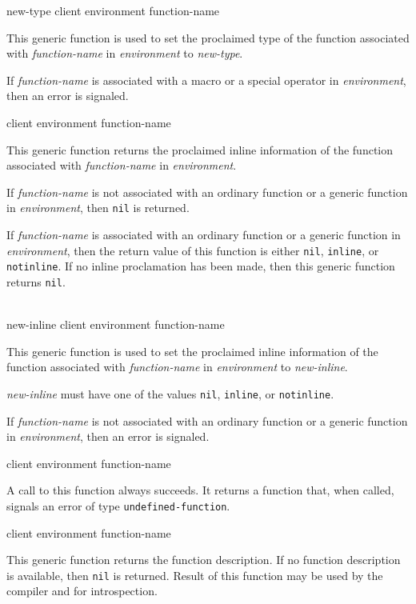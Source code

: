  {new-type client environment function-name}

This generic function is used to set the proclaimed type of the
function associated with \textit{function-name} in
\textit{environment} to \textit{new-type}.

If \textit{function-name} is associated with a macro or a special
operator in \textit{environment}, then an error is signaled.

 {client environment function-name}

This generic function returns the proclaimed inline information of the
function associated with \textit{function-name} in
\textit{environment}.

If \textit{function-name} is not associated with an ordinary function
or a generic function in \textit{environment}, then \texttt{nil} is
returned.

If \textit{function-name} is associated with an ordinary function or a
generic function in \textit{environment}, then the return value of
this function is either \texttt{nil}, \texttt{inline}, or
\texttt{notinline}.  If no inline proclamation has been made, then
this generic function returns \texttt{nil}.

\\
{new-inline client environment function-name}

This generic function is used to set the proclaimed inline information
of the function associated with \textit{function-name} in
\textit{environment} to \textit{new-inline}.

\textit{new-inline} must have one of the values \texttt{nil},
\texttt{inline}, or \texttt{notinline}.

If \textit{function-name} is not associated with an ordinary function
or a generic function in \textit{environment}, then an error is
signaled.

 {client environment function-name}

A call to this function always succeeds.  It returns a function that, when
called, signals an error of type \texttt{undefined-function}.

 {client environment function-name}

This generic function returns the function description. If no function
description is available, then \texttt{nil} is returned. Result of this
function may be used by the compiler and for introspection.


